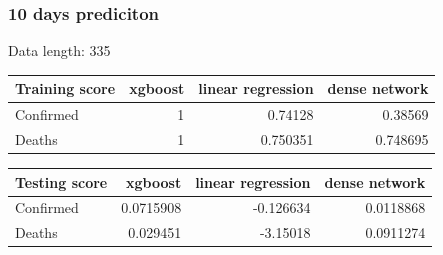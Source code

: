 \documentclass[a4paper,12pt]{article}
\begin{document}
\subsubsection{10 days prediciton}
\begin{tcolorbox}
    Data length:	 335
    
    \begin{tabular}{lrrr}
    \toprule
     Training score   &   xgboost &   linear regression &   dense network \\
    \midrule
     Confirmed        &         1 &            0.74128  &        0.38569  \\
     Deaths           &         1 &            0.750351 &        0.748695 \\
    \bottomrule
    \end{tabular}
    
    
    \begin{tabular}{lrrr}
    \toprule
     Testing score   &   xgboost &   linear regression &   dense network \\
    \midrule
     Confirmed       & 0.0715908 &           -0.126634 &       0.0118868 \\
     Deaths          & 0.029451  &           -3.15018  &       0.0911274 \\
    \bottomrule
    \end{tabular}
    
\end{tcolorbox}
\end{document}
